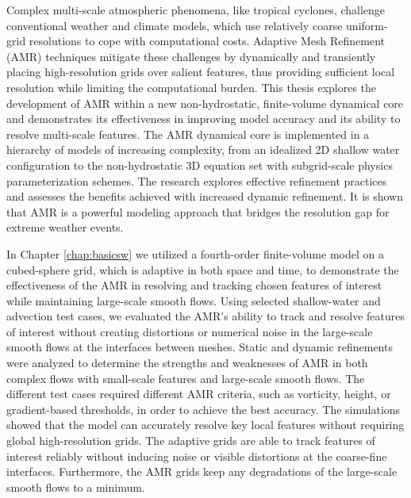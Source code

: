 Complex multi-scale atmospheric phenomena, like tropical 
cyclones, challenge conventional weather and climate models, 
which use relatively coarse uniform-grid resolutions to cope with 
computational costs. Adaptive Mesh Refinement (AMR) techniques 
mitigate these challenges by dynamically and transiently placing high-resolution grids 
over salient features, thus providing sufficient local resolution while 
limiting the computational burden. 
This thesis explores the development of AMR within a new 
non-hydrostatic, finite-volume dynamical core and demonstrates its 
effectiveness in improving model accuracy and its ability to resolve 
multi-scale features. The AMR dynamical core is implemented in a 
hierarchy of models of increasing complexity, from an idealized 2D 
shallow water configuration to the non-hydrostatic 3D equation set 
with subgrid-scale physics parameterization schemes. The research explores 
effective refinement practices and assesses the benefits achieved 
with increased dynamic refinement. It is shown that AMR is a 
powerful modeling approach that bridges the resolution gap for 
extreme weather events.

In Chapter \ref{chap:basicsw} we utilized a fourth-order
finite-volume model on a cubed-sphere grid, which is adaptive in both
space and time, to demonstrate the effectiveness of the AMR in resolving
and tracking chosen features of interest while maintaining large-scale
smooth flows.  Using selected shallow-water and advection test cases, we
evaluated the AMR's ability to track and resolve features of interest
without creating distortions or numerical noise in the large-scale
smooth flows at the interfaces between meshes. 
Static and dynamic refinements were analyzed to determine the 
strengths and weaknesses of AMR in both complex flows with small-scale
 features and large-scale smooth flows. The different test cases required 
 different AMR criteria, such as vorticity, height, or gradient-based thresholds, 
 in order to achieve the best accuracy. The simulations showed that the 
 model can accurately resolve key local features without requiring global 
 high-resolution grids. The adaptive grids are able to track features of interest 
 reliably without inducing noise or visible distortions at the coarse-fine interfaces. 
 Furthermore, the AMR grids keep any degradations of the large-scale smooth flows to a minimum.
 
